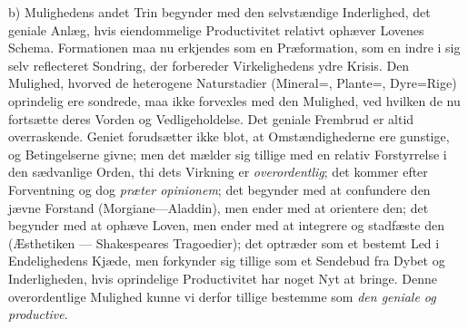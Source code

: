 \documentclass[12pt]{book}
\newcommand{\opage}[1]{\marginnote{\footnotesize\textit{[#1]}}}
\begin{document}
b) Mulighedens andet Trin begynder med den selvstændige Inderlighed, det geniale Anlæg, hvis
eiendommelige Productivitet relativt ophæver Lovenes Schema. Formationen maa nu erkjendes som
en Præformation, som en indre i sig selv reflecteret Sondring, der forbereder Virkelighedens
ydre Krisis. Den Mulighed, hvorved de heterogene Naturstadier (Mineral=, Plante=, Dyre=Rige)
oprindelig ere sondrede, maa ikke forvexles med den Mulighed, ved hvilken de nu fortsætte
deres Vorden og Vedligeholdelse. Det geniale Frembrud er altid overraskende. Geniet
forudsætter ikke blot, at Omstændighederne ere gunstige, og Betingelserne givne; men det
mælder sig tillige med en relativ Forstyrrelse i den sædvanlige Orden, thi dets Virkning er
\emph{overordentlig}; det kommer efter Forventning og dog \textit{præter opinionem}; det
begynder med at confundere den jævne Forstand (Morgiane---Aladdin), men ender med at
orientere den; det begynder med at ophæve Loven, men ender med at integrere og stadfæste den
(Æsthetiken --- Shakespeares Tragoedier); det optræder som et bestemt Led i Endelighedens
Kjæde, men forkynder sig tillige som et Sendebud fra Dybet og Inderligheden, hvis oprindelige
Productivitet har noget
\opage{155} Nyt at bringe. Denne overordentlige Mulighed kunne vi derfor tillige bestemme som \emph{den
geniale og productive}.
\end{document}
